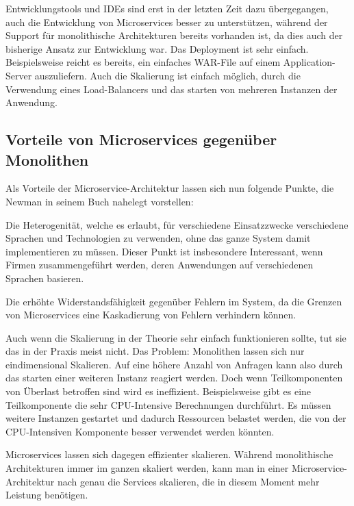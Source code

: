 \documentclass[12pt,a4paper,bibliography=totocnumbered,listof=totocnumbered]{scrartcl}
\begin{document}
Entwicklungstools und IDEs sind erst in der letzten Zeit dazu übergegangen, auch die Entwicklung von Microservices besser zu unterstützen, während der Support für monolithische Architekturen bereits vorhanden ist, da dies auch der bisherige Ansatz zur Entwicklung war.
Das Deployment ist sehr einfach. Beispielsweise reicht es bereits, ein einfaches WAR-File auf einem Application-Server auszuliefern.
Auch die Skalierung ist einfach möglich, durch die Verwendung eines Load-Balancers und das starten von mehreren Instanzen der Anwendung.\cite{richardson}

\subsection{Vorteile von Microservices gegenüber Monolithen}\label{ch:ms-mon-pro}

Als Vorteile der Microservice-Architektur lassen sich nun folgende Punkte, die Newman in seinem Buch nahelegt vorstellen\cite{buildingms}:

Die Heterogenität, welche es erlaubt, für verschiedene Einsatzzwecke verschiedene Sprachen und Technologien zu verwenden, ohne das ganze System damit implementieren zu müssen. Dieser Punkt ist insbesondere Interessant, wenn Firmen zusammengeführt werden, deren Anwendungen auf verschiedenen Sprachen basieren.

Die erhöhte Widerstandsfähigkeit gegenüber Fehlern im System, da die Grenzen von Microservices eine Kaskadierung von Fehlern verhindern können.

Auch wenn die Skalierung in der Theorie sehr einfach funktionieren sollte, tut sie das in der Praxis meist nicht. Das Problem: Monolithen lassen sich nur eindimensional Skalieren. Auf eine höhere Anzahl von Anfragen kann also durch das starten einer weiteren Instanz reagiert werden. Doch wenn Teilkomponenten von Überlast betroffen sind wird es ineffizient. Beispielsweise gibt es eine Teilkomponente die sehr CPU-Intensive Berechnungen durchführt. Es müssen weitere Instanzen gestartet und dadurch Ressourcen belastet werden, die von der CPU-Intensiven Komponente besser verwendet werden könnten.


Microservices lassen sich dagegen effizienter skalieren. Während monolithische Architekturen immer im ganzen skaliert werden, kann man in einer Microservice-Architektur nach genau die Services skalieren, die in diesem Moment mehr Leistung benötigen.
\end{document}
